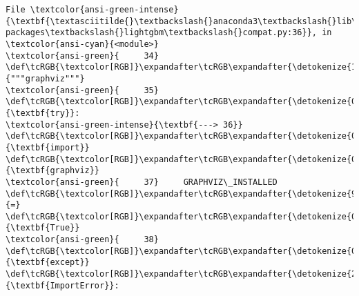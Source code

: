 \documentclass[11pt]{article}
\begin{document}
\begin{Verbatim}[commandchars=\\\{\}, frame=single, framerule=2mm, rulecolor=\color{outerrorbackground}]
File \textcolor{ansi-green-intense}{\textbf{\textasciitilde{}\textbackslash{}anaconda3\textbackslash{}lib\textbackslash{}site-packages\textbackslash{}lightgbm\textbackslash{}compat.py:36}}, in \textcolor{ansi-cyan}{<module>}
\textcolor{ansi-green}{     34} \def\tcRGB{\textcolor[RGB]}\expandafter\tcRGB\expandafter{\detokenize{175,0,0}}{"""graphviz"""}
\textcolor{ansi-green}{     35} \def\tcRGB{\textcolor[RGB]}\expandafter\tcRGB\expandafter{\detokenize{0,135,0}}{\textbf{try}}:
\textcolor{ansi-green-intense}{\textbf{---> 36}}     \def\tcRGB{\textcolor[RGB]}\expandafter\tcRGB\expandafter{\detokenize{0,135,0}}{\textbf{import}} \def\tcRGB{\textcolor[RGB]}\expandafter\tcRGB\expandafter{\detokenize{0,0,255}}{\textbf{graphviz}}
\textcolor{ansi-green}{     37}     GRAPHVIZ\_INSTALLED \def\tcRGB{\textcolor[RGB]}\expandafter\tcRGB\expandafter{\detokenize{98,98,98}}{=} \def\tcRGB{\textcolor[RGB]}\expandafter\tcRGB\expandafter{\detokenize{0,135,0}}{\textbf{True}}
\textcolor{ansi-green}{     38} \def\tcRGB{\textcolor[RGB]}\expandafter\tcRGB\expandafter{\detokenize{0,135,0}}{\textbf{except}} \def\tcRGB{\textcolor[RGB]}\expandafter\tcRGB\expandafter{\detokenize{215,95,95}}{\textbf{ImportError}}:


\end{Verbatim}
\end{document}
